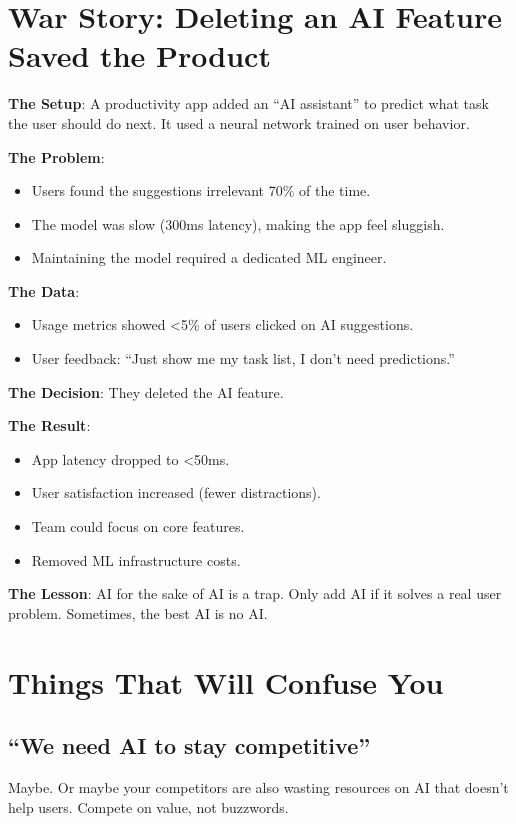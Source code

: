 \documentclass[11pt,oneside]{book}
\begin{document}
\section{War Story: Deleting an AI Feature Saved the Product}

\textbf{The Setup}: A productivity app added an ``AI assistant'' to predict what task the user should do next. It used a neural network trained on user behavior.

\textbf{The Problem}:
\begin{itemize}
\item Users found the suggestions irrelevant 70\% of the time.
\item The model was slow (300ms latency), making the app feel sluggish.
\item Maintaining the model required a dedicated ML engineer.
\end{itemize}

\textbf{The Data}:
\begin{itemize}
\item Usage metrics showed <5\% of users clicked on AI suggestions.
\item User feedback: ``Just show me my task list, I don't need predictions.''
\end{itemize}

\textbf{The Decision}: They deleted the AI feature.

\textbf{The Result}:
\begin{itemize}
\item App latency dropped to <50ms.
\item User satisfaction increased (fewer distractions).
\item Team could focus on core features.
\item Removed ML infrastructure costs.
\end{itemize}

\textbf{The Lesson}: AI for the sake of AI is a trap. Only add AI if it solves a real user problem. Sometimes, the best AI is no AI.

\section{Things That Will Confuse You}

\subsection{``We need AI to stay competitive''}
Maybe. Or maybe your competitors are also wasting resources on AI that doesn't help users. Compete on value, not buzzwords.
\end{document}
